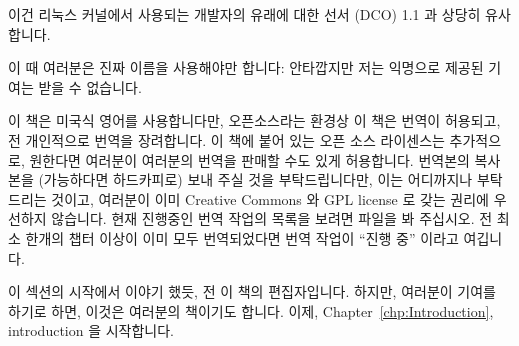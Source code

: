 이건 리눅스 커널에서 사용되는 개발자의 유래에 대한 선서 (DCO) 1.1 과
상당히 유사합니다.
\iffalse

This is quite similar to the Developer's Certificate of Origin (DCO)
1.1 used by the Linux kernel.
\fi

이 때 여러분은 진짜 이름을 사용해야만 합니다: 안타깝지만 저는 익명으로 제공된
기여는 받을 수 없습니다.
\iffalse

You must use your real name:  I unfortunately cannot accept pseudonymous or
anonymous contributions.
\fi

이 책은 미국식 영어를 사용합니다만, 오픈소스라는 환경상 이 책은 번역이
허용되고, 전 개인적으로 번역을 장려합니다.
이 책에 붙어 있는 오픈 소스 라이센스는 추가적으로, 원한다면 여러분이 여러분의
번역을 판매할 수도 있게 허용합니다.
번역본의 복사본을 (가능하다면 하드카피로) 보내 주실 것을 부탁드립니다만, 이는
어디까지나 부탁드리는 것이고, 여러분이 이미 Creative Commons 와 GPL license 로
갖는 권리에 우선하지 않습니다.
현재 진행중인 번역 작업의 목록을 보려면  파일을 봐 주십시오.
전 최소 한개의 챕터 이상이 이미 모두 번역되었다면 번역 작업이 ``진행 중''
이라고 여깁니다.
\iffalse

The language of this book is American English, however, the open-source
nature of this book permits translations, and I personally encourage them.
The open-source licenses covering this book additionally allow you
to sell your translation, if you wish.
I do request that you send me a copy of the translation (hardcopy if
available), but this is a request made as a professional courtesy,
and is not in any way a prerequisite to the permission that you already
have under the Creative Commons and GPL licenses.
Please see the \co{FAQ.txt} file in the source tree for a list of
translations currently in progress.
I consider a translation effort to be ``in progress'' once at least one
chapter has been fully translated.
\fi

이 섹션의 시작에서 이야기 했듯, 전 이 책의 편집자입니다.
하지만, 여러분이 기여를 하기로 하면, 이것은 여러분의 책이기도 합니다.
이제, Chapter~\ref{chp:Introduction}, introduction 을 시작합니다.
\iffalse

As noted at the beginning of this section, I am this book's editor.
However, if you choose to contribute, it will be your book as well.
With that, I offer you Chapter~\ref{chp:Introduction}, our introduction.
\fi

